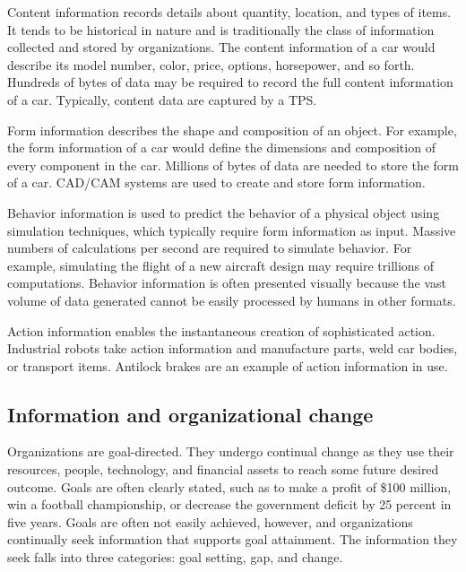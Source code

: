 \documentclass[
]{article}
\begin{document}
Content information records details about quantity, location, and types
of items. It tends to be historical in nature and is traditionally the
class of information collected and stored by organizations. The content
information of a car would describe its model number, color, price,
options, horsepower, and so forth. Hundreds of bytes of data may be
required to record the full content information of a car. Typically,
content data are captured by a TPS.

Form information describes the shape and composition of an object. For
example, the form information of a car would define the dimensions and
composition of every component in the car. Millions of bytes of data are
needed to store the form of a car. CAD/CAM systems are used to create
and store form information.

Behavior information is used to predict the behavior of a physical
object using simulation techniques, which typically require form
information as input. Massive numbers of calculations per second are
required to simulate behavior. For example, simulating the flight of a
new aircraft design may require trillions of computations. Behavior
information is often presented visually because the vast volume of data
generated cannot be easily processed by humans in other formats.

Action information enables the instantaneous creation of sophisticated
action. Industrial robots take action information and manufacture parts,
weld car bodies, or transport items. Antilock brakes are an example of
action information in use.

\hypertarget{information-and-organizational-change}{%
\subsection*{Information and organizational change}\label{information-and-organizational-change}}

Organizations are goal-directed. They undergo continual change as they
use their resources, people, technology, and financial assets to reach
some future desired outcome. Goals are often clearly stated, such as to
make a profit of \$100 million, win a football championship, or decrease
the government deficit by 25 percent in five years. Goals are often not
easily achieved, however, and organizations continually seek information
that supports goal attainment. The information they seek falls into
three categories: goal setting, gap, and change.
\end{document}

